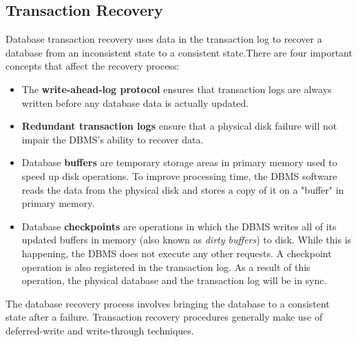 \documentclass[a4paper, 11pt, titlepage]{report}
\begin{document}
\subsection{Transaction Recovery}
Database transaction recovery uses data in the transaction log to recover a database from an inconsistent state to a consistent state.There are four important concepts that affect the recovery process:
\begin{itemize}
\item The \textbf{write-ahead-log protocol} ensures that transaction logs are always written before
any database data is actually updated.
\item \textbf{Redundant transaction logs} ensure that a physical disk failure will not impair the DBMS's ability to recover data.
\item Database \textbf{buffers} are temporary storage areas in primary memory used to speed up
disk operations. To improve processing time, the DBMS software reads the data from the physical disk and stores a copy of it on a "buffer" in primary memory.
\item Database \textbf{checkpoints} are operations in which the DBMS writes all of its updated buffers in memory (also known as \textit{dirty buffers}) to disk. While this is happening, the DBMS does not execute any other requests. A checkpoint operation is also registered in the transaction log. As a result of this operation, the physical database and the transaction log will be in sync.
\end{itemize}
The database recovery process involves bringing the database to a consistent state
after a failure. Transaction recovery procedures generally make use of deferred-write and
write-through techniques.
\end{document}
